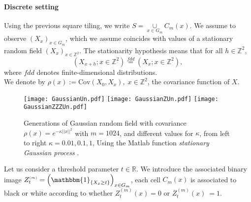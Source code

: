 \documentclass[12pt]{article}
\theoremstyle{Theorem}
\begin{document}
\paragraph{Discrete setting}
Using the previous square tiling, we write $S =  \underset{x \in G_m}{\cup}  C_{m}(x)$. We assume to observe $\left(X_{\scriptscriptstyle x}\right)_{x \in G_{m}}$, which we assume coincides with values of a stationary random field $\left(X_{\scriptscriptstyle x}\right)_{x \in \mathbb{Z}^{2}}$. The stationarity hypothesis means that for all $h \in \mathbb{Z}^{2}$, 
$$\left(X_{x+h}; x \in \mathbb{Z}^{2} \right)\overset{fdd}{=} \left(X_{\scriptscriptstyle x}; x \in \mathbb{Z}^{2} \right),$$ where $fdd$ denotes finite-dimensional distributions. \\
We denote by $\rho(x) :=\text{Cov}\left(X_{\scriptscriptstyle 0}, X_{\scriptscriptstyle x}\right), \; x \in \mathbb{Z}^{2}$, the covariance function of $X$.
\vspace{-1.5cm}
\begin{figure}[H]
    {\texttt{[image: GaussianUn.pdf]}}
    {\texttt{[image: GaussianZUn.pdf]}}
    {\texttt{[image: GaussianZZZUn.pdf]}}
    \vspace{-2cm}
 \caption{Generations of Gaussian random field with covariance $\rho(x) = e^{-\kappa||x||^{2}}$ with $m = 1024$, and different values for $\kappa$, from left to right $\kappa = 0.01, 0.1, 1$, Using the Matlab function \textit{stationary Gaussian process} \cite{MATLAB}.}
\label{fig22}
\end{figure}
Let us consider a threshold parameter $t \in \mathbb{R}$. We introduce the associated binary image $Z^{\scriptscriptstyle (m)}_{t} = \left(\mathbbm{1}_{\left\{X_x \geq t\right\}} \right)_{x \in G_{m}}$, each cell $C_{m}(x)$ is associated to black or white according to whether $Z^{\scriptscriptstyle (m)}_{t} (x) = 0$ or $Z^{\scriptscriptstyle (m)}_{t}(x)~= 1$. 
\end{document}
